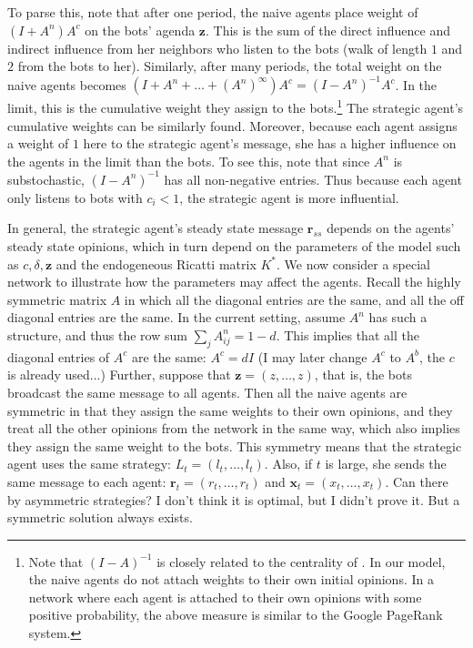 \documentclass{article}
\newcommand{\x}{\mathbf{x}}
\newcommand{\re}{\mathbf{r}}
\newcommand{\z}{\mathbf{z}}
\newcommand{\wl}[1]{{\color{blue} #1}}
\begin{document}
To parse this, note that after one period, the naive agents place weight of $(I+A^n)A^c$ on the bots' agenda $\z$. This is the sum of the direct influence and indirect influence from her neighbors who listen to the bots (walk of length $1$ and $2$ from the bots to her). Similarly, after many periods, the total weight on the naive agents becomes $(I+A^n+\ldots+(A^n)^\infty)A^c=(I-A^n)^{-1}A^c$. In the limit, this is the cumulative weight they assign to the bots.\footnote{Note that $(I-A)^{-1}$ is closely related to the centrality of \cite{katz1953}. In our model, the naive agents do not attach weights to their own initial opinions. In a network where each agent is attached to their own opinions with some positive probability, the above measure is similar to the Google PageRank system.} The strategic agent's cumulative weights can be similarly found. Moreover, because each agent assigns a weight of $1$ here to the strategic agent's message, she has a higher influence on the agents in the limit than the bots. To see this, note that since $A^n$ is substochastic, $(I-A^n)^{-1}$ has all non-negative entries. Thus because each agent only listens to bots with $c_i<1$, the strategic agent is more influential. 

In general, the strategic agent's steady state message $\re_{ss}$ depends on the agents' steady state opinions, which in turn depend on the parameters of the model such as $c,\delta,\z$ and the endogeneous Ricatti matrix $K^*$. We now consider a special network to illustrate how the parameters may affect the agents. 
Recall the highly symmetric matrix $A$ in which all the diagonal entries are the same, and all the off diagonal entries are the same. In the current setting, assume $A^n$ has such a structure, and thus the row sum $\sum_j A^n_{ij}=1-d$. This implies that all the diagonal entries of $A^c$ are the same: $A^c=dI$ (I may later change $A^c$ to $A^b$, the $c$ is already used...) Further, suppose that $\z=(z,\ldots,z)$, that is, the bots broadcast the same message to all agents. Then all the naive agents are symmetric in that they assign the same weights to their own opinions, and they treat all the other opinions from the network in the same way, which also implies they assign the same weight to the bots. This symmetry means that the strategic agent uses the same strategy: $L_t=(l_t,\ldots,l_t)$. Also,  if $t$ is large, she sends the same message to each agent: $\re_t=(r_t,\ldots,r_t)$ and $\x_t=(x_t,\ldots,x_t)$. \wl{Can there by asymmetric strategies? I don't think it is optimal, but I didn't prove it. But a symmetric solution always exists.} 
\end{document}
